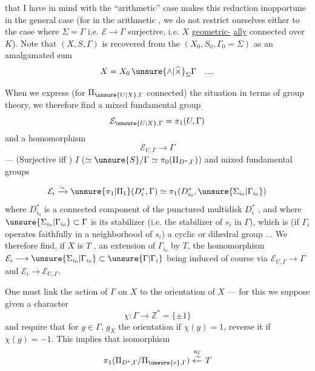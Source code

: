 
that I have in mind with the ``arithmetic'' case
makes this reduction inopportune in the
general case (for in the arithmetic ,
we do not restrict ourselves either to the case where
$\Sigma=\Gamma$ i.e. $\mathcal E\longrightarrow\Gamma$ surjective, i.e. 
$X$ \uline{geometric-}
\uline{ally} connected over $K$). Note  that
$(X,S,\Gamma)$ is recovered from the
$(X_0,S_0,\Gamma_0=\Sigma)$ as an amalgamated sum
\[
X=X_0\,\unsure{\wedge|\widehat\times}_{\Sigma}\Gamma\quad ....
\]

When we express (for $\Pi_{\unsure{U|X},\Gamma}$ connected)
the situation in terms of group theory,
we therefore find  a mixed
fundamental group 
\[
\mathcal E_{\unsure{U|X},\Gamma}=\pi_1(U,\Gamma)
\]
and a homomorphism
\[
\mathcal E_{U,\Gamma}\longrightarrow\Gamma
\]
--- (Surjective iff 
)
$I$ ($\simeq\unsure{S}/\Gamma\simeq\pi_0(\Pi_{D^*,\Gamma})$) and
mixed fundamental groups


\[
\mathcal E_i\xrightarrow{\sim}\unsure{\pi_1|\Pi_1}(D_i^*,\Gamma)
\simeq\pi_1(D_{i_0}^*,\unsure{\Sigma_{i_0}|\Gamma_{i_0}})
\]
where $D_{i_0}^*$ is a connected component of the
punctured multidisk $D_i^*$ , and where $\unsure{\Sigma_{i_0}|\Gamma_{i_0}}\subset\Gamma$ is
its stabilizer (i.e. the stabilizer of
$s_i$ in $\Gamma$), which is  (if $\Gamma_i$  operates
faithfully in a neighborhood of $s_i$) a cyclic
or dihedral group ... We therefore find, if $X$ is
$T$ , an extension of $\Gamma_{i_0}$ by $T$,
the homomorphism $\mathcal E_i\longrightarrow\unsure{\Sigma_{i_0}|\Gamma_{i_0}}\subset\unsure{\Gamma|\Gamma_i}$ being induced
of course via $\mathcal E_{U,\Gamma}\longrightarrow\Gamma$ and $\mathcal E_i\longrightarrow\mathcal E_{U,\Gamma}$.

One must  link the action of $\Gamma$ on $X$ to
the orientation of $X$ --- for this we suppose
given a character
\[
\chi:\Gamma\longrightarrow\mathbb Z^*=\{\pm1\}
\]
and require that for $g\in\Gamma$, $g_X$ 
the orientation if $\chi(g)=1$, reverse it if $\chi(g)=-1$.
This implies that  isomorphism
\[
\pi_1(\Pi_{D^*,\Gamma}/\Pi_{\unsure{e},\Gamma})
\overset{\kappa_\Gamma}{\xleftarrow{\sim}}T
\]

